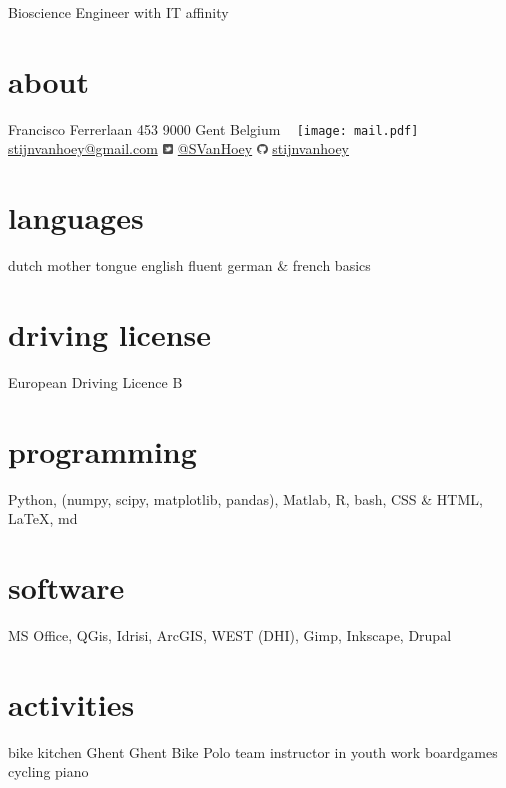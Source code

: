 \documentclass[]{stvhoey-cv}  %
\begin{document}
       {Bioscience Engineer with IT affinity}

\begin{aside}
  \section{about}
    Francisco Ferrerlaan 453
    9000 Gent
    Belgium
    ~
    \texttt{[image: mail.pdf]}   \href{mailto:stijnvanhoey@gmail.com}{stijnvanhoey@gmail.com}
    	\includegraphics[height=8pt]{twitter.pdf} \href{https://twitter.com/svanhoey}{@SVanHoey}
	\includegraphics[height=8pt]{github.pdf} \href{http://github.com/stijnvanhoey}{stijnvanhoey}%
  \section{languages}
    dutch mother tongue
    english fluent
   german \&  french basics
  \section{driving license}
  European Driving
  Licence B
  \section{programming}
   Python, %
    (numpy, scipy,
    matplotlib, pandas),
    Matlab, R, bash,
    CSS \& HTML,
    \LaTeX, md
  \section{software}
   MS Office,
   QGis, Idrisi, ArcGIS,
   WEST (DHI),
   Gimp, Inkscape,
   Drupal
   \section{activities}
   bike kitchen Ghent
   Ghent Bike Polo team
   instructor in youth work
   boardgames
   cycling
   piano    
\end{aside}
   
\end{document}
